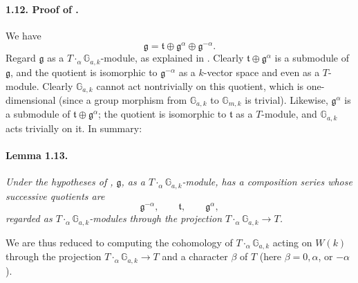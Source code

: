 
\paragraph{\textbf{1.12. Proof of .}}
We have
\[
  \mathfrak g
    =\mathfrak t\oplus\mathfrak g^\alpha\oplus\mathfrak g^{-\alpha}.
\]
Regard \(\mathfrak g\) as a
\(T\mathbin{\cdot_\alpha}\mathbb G_{a,k}\)-module, as explained in . Clearly
\(\mathfrak t\oplus\mathfrak g^\alpha\) is a submodule of
\(\mathfrak g\), and the quotient is isomorphic to
\(\mathfrak g^{-\alpha}\) as a \(k\)-vector space and even as a
\(T\)-module. Clearly \(\mathbb G_{a,k}\) cannot act nontrivially on
this quotient, which is one-dimensional (since a group morphism
from \(\mathbb G_{a,k}\) to \(\mathbb G_{m,k}\) is trivial). Likewise,
\(\mathfrak g^\alpha\) is a submodule of
\(\mathfrak t\oplus\mathfrak g^\alpha\); the quotient is isomorphic
to \(\mathfrak t\) as a \(T\)-module, and
\(\mathbb G_{a,k}\) acts trivially on it. In summary:

\paragraph{\textbf{Lemma 1.13.}}
\emph{Under the hypotheses of , \(\mathfrak g\), as a
\(T\mathbin{\cdot_\alpha}\mathbb G_{a,k}\)-module, has a
composition series whose successive quotients are}
\[
  \mathfrak g^{-\alpha},\qquad \mathfrak t,\qquad
  \mathfrak g^\alpha,
\]
\emph{regarded as
\(T\mathbin{\cdot_\alpha}\mathbb G_{a,k}\)-modules through the
projection
\(T\mathbin{\cdot_\alpha}\mathbb G_{a,k}\to T\).}

We are thus reduced to computing the cohomology of
\(T\mathbin{\cdot_\alpha}\mathbb G_{a,k}\) acting on \(W(k)\)
through the projection
\(T\mathbin{\cdot_\alpha}\mathbb G_{a,k}\to T\) and a character
\(\beta\) of \(T\) (here \(\beta=0,\alpha\), or \(-\alpha\)).

